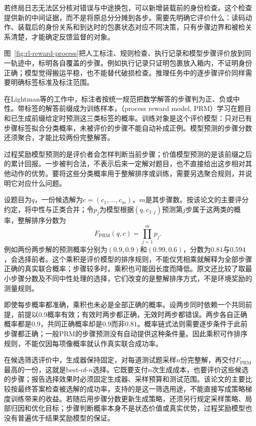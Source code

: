 若终局日志无法区分核对错误与中途换包，可以新增装载前的身份检查。这个检查提供新的中间证据，而不是将原总分分摊到各步。需要先明确它评价什么：读码动作、装载后的身份关系和到达时的包裹状态对应不同决策，只有步骤边界和被检关系清楚，才能确定反馈监督的对象。

图~\ref{fig:rl-reward-process}把人工标注、规则检查、执行记录和模型步骤评价放到同一轨迹中，标明各自覆盖的步骤。例如执行记录只证明包裹放入箱内，不证明身份正确；模型觉得搬运平稳，也不能替代破损检查。推理任务中的逐步骤评价同样需要明确标签标准及标注范围。

在Lightman等的工作中，标注者按统一规范把数学解答的步骤判为正、负或中性。带标签的解答前缀成为训练样本，（process reward model, PRM）学习在题目和已生成前缀给定时预测这三类标签的概率。训练对象是这个评价模型：只对已有步骤标签拟合分类概率，未被评价的步骤不能自动补成正例。模型预测的步骤分数还须聚合，才能比较两份完整解答。

过程奖励模型预测的是评价者会怎样判断当前步骤；价值模型预测的是该前缀之后的累计回报。一步被判合法，不表示后来一定解对题目，也不直接给出这步相对其他动作的优势。要将这些分类概率用于整解排序或训练，需要另选聚合规则，并说明它对应什么问题。

设题目为$q$，一份候选解为$c=(c_1,\ldots,c_m)$，$m$是其步骤数。按该论文的主要评分约定，将中性与正类合并；令$p_j$为模型根据$(q,c_{1:j})$预测第$j$步属于这两类的概率，整解排序分数为
\begin{equation}
  F_{\mathrm{PRM}}(q,c)=\prod_{j=1}^{m}p_j.
  \label{eq:rl-reward-prm-score}
\end{equation}
例如两份两步解的预测概率分别为$(0.9,0.9)$和$(0.99,0.6)$，分数为$0.81$与$0.594$，会选择前者。这个乘积是评价模型的排序规则，不能仅凭相乘就解释为全部步骤正确的真实联合概率；步骤较多时，乘积也可能因长度而降低。原文还比较了取最小步骤分数及不同中性处理的选择，它们改变的是整解排序方式，不是环境奖励的测量规则。

即使每步概率都准确，乘积也未必是全部正确的概率。设两步同时依赖一个共同前提，前提以$0.9$概率有效；有效时两步都正确，无效时两步都错误。两步各自正确概率都是$0.9$，共同正确概率却是$0.9$而非$0.81$。概率链式法则需要逐步条件于此前步骤都正确；一般PRM的步骤预测没有自动提供这种条件量。因此乘积可作排序规则，不能仅因每项像概率就认作真实联合成功率。

在候选筛选评价中，生成器保持固定，对每道测试题采样$n$份完整解，再交付$F_{\mathrm{PRM}}$最高的一份，这就是best-of-$n$选择。它既要支付$n$次生成成本，也要评价这些候选的步骤；报告选择效果时必须固定生成器、采样预算和测试范围。该论文的主要比较按最终答案检查被选解的成功率，支持的是这一筛选用途，不能直接写成策略梯度训练带来的收益。若随后用步骤分数更新生成策略，还须另行规定采样策略、局部归因和优化目标；步骤判断概率本身不是状态价值或真实优势，过程奖励模型也没有普遍优于结果奖励模型的保证。

